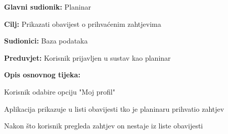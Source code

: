 		\noindent {}
	\begin{packed_item}
		
		\item \textbf{Glavni sudionik: }$ $Planinar$ $
		\item  \textbf{Cilj:} $ $Prikazati obavijest o prihvaćenim zahtjevima$ $
		\item  \textbf{Sudionici:} $ $Baza podataka$ $
		\item  \textbf{Preduvjet:} $ $Korisnik prijavljen u sustav kao planinar$ $
		\item  \textbf{Opis osnovnog tijeka:}
		
		\item[] \begin{packed_enum}
			
			\item $ $Korisnik odabire opciju "Moj profil"$ $
			\item $ $Aplikacija prikazuje u listi obavijesti tko je planinaru prihvatio zahtjev $ $
			\item $ $Nakon što korisnik pregleda zahtjev on nestaje iz liste obavijesti $ $	
			
		\end{packed_enum}
	\end{packed_item}

